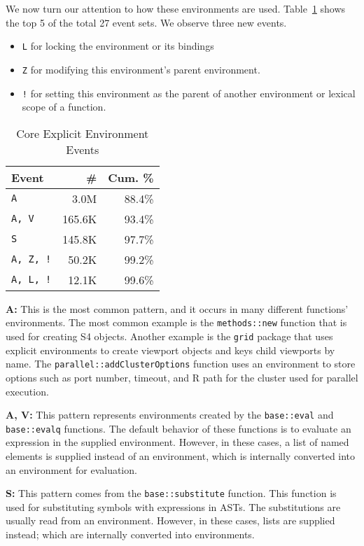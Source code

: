 \documentclass[10pt,review,sigplan,authorversion=true]{acmart}
\newcommand{\code}[1]{\lstinline |#1|\xspace}
\begin{document}
We now turn our attention to how these environments are used.
Table~\ref{table:core_explicit_env_seq} shows the top 5 of the total 27 event
sets. We observe three new events.
\begin{itemize}
\item \texttt{L} for locking the environment or its bindings
\item \texttt{Z} for modifying this environment's parent environment.
\item \texttt{!} for setting this environment as the parent of another
  environment or lexical scope of a function.
\end{itemize}

\begin{table}[!h]
  \small
  \caption{Core Explicit Environment Events} \label{table:core_explicit_env_seq}
  \centering
  \begin{tabular}{lrr}
    \toprule
    \textbf{Event}&\textbf{\#}&\textbf{Cum. \%}\\
    \midrule
    \texttt{A}&3.0M&88.4\%\\
    \texttt{A, V}&165.6K&93.4\%\\
    \texttt{S}&145.8K&97.7\%\\
    \texttt{A, Z, !}&50.2K&99.2\%\\
    \texttt{A, L, !}&12.1K&99.6\%\\
    \bottomrule
  \end{tabular}
\end{table}

\noindent
\textbf{A:} This is the most common pattern, and it occurs in many different
functions' environments. The most common example is the \code{methods::new}
function that is used for creating S4 objects. Another example is the
\code{grid} package that uses explicit environments to create viewport objects
and keys child viewports by name. The \code{parallel::addClusterOptions} function
uses an environment to store options such as port number, timeout, and R path
for the cluster used for parallel execution.

\noindent
\textbf{A, V:} This pattern represents environments created by the
\code{base::eval} and \code{base::evalq} functions. The default behavior of
these functions is to evaluate an expression in the supplied environment.
However, in these cases, a list of named elements is supplied instead of an
environment, which is internally converted into an environment for evaluation.

\noindent
\textbf{S:} This pattern comes from the \code{base::substitute} function. This
function is used for substituting symbols with expressions in ASTs. The
substitutions are usually read from an environment. However, in these cases,
lists are supplied instead; which are internally converted into environments.
\end{document}
